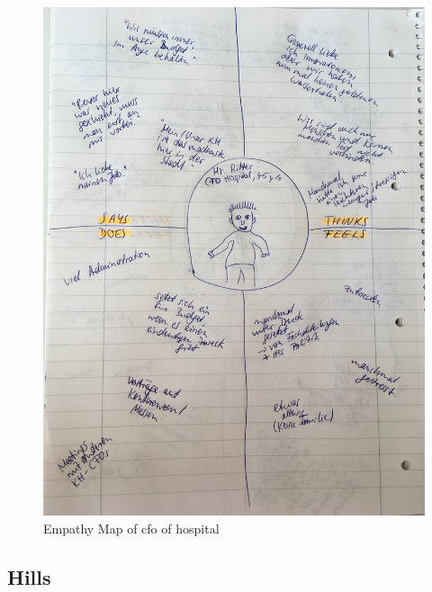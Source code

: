 \begin{figure}[h!]
	\centering
	\includegraphics[width=1\textwidth]{images/empathymap_cfo.jpg}
	\caption{Empathy Map of \ac{cfo} of hospital}
	\label{cfo}
\end{figure}


\subsection{Hills}

